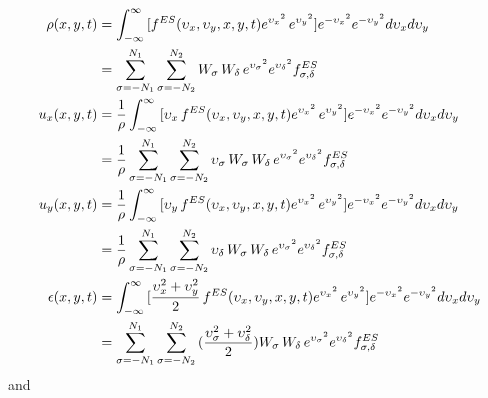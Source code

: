\documentclass{rsproca}%
\begin{document}
\begin{align}
	\begin{split}
\rho(x,y,t) &= \int^{\infty}_{-\infty}{[f^{ES}(\upsilon_x,\upsilon_y,x,y,t)e^{{\upsilon_x}^2}\,e^{{\upsilon_y}^2}]e^{-{\upsilon_x}^2}e^{-{\upsilon_y}^2}d\upsilon_x d\upsilon_y}  \\
&=\sum^{N_1}_{\sigma=-N_1}\sum^{N_2}_{\sigma=-N_2}{W_\sigma\,W_\delta\,e^{{\upsilon_\sigma}^2}e^{{\upsilon_\delta}^2}f^{ES}_{\sigma,\delta}} \\
u_x(x,y,t) &= {1 \over \rho} \int^{\infty}_{-\infty}{[\upsilon_x\,f^{ES}(\upsilon_x,\upsilon_y,x,y,t)e^{{\upsilon_x}^2}\,e^{{\upsilon_y}^2}]e^{-{\upsilon_x}^2}e^{-{\upsilon_y}^2}d\upsilon_x d\upsilon_y}  \\
&= {1 \over \rho} \sum^{N_1}_{\sigma=-N_1}\sum^{N_2}_{\sigma=-N_2}{\upsilon_\sigma\,W_\sigma\,W_\delta\,e^{{\upsilon_\sigma}^2} e^{{\upsilon_\delta}^2}f^{ES}_{\sigma,\delta}}  \\
u_y(x,y,t) &= {1 \over \rho} \int^{\infty}_{-\infty}{[\upsilon_y\,f^{ES}(\upsilon_x,\upsilon_y,x,y,t)e^{{\upsilon_x}^2}\,e^{{\upsilon_y}^2}]e^{-{\upsilon_x}^2}e^{-{\upsilon_y}^2}d\upsilon_x d\upsilon_y}  \\
&= {1 \over \rho} \sum^{N_1}_{\sigma=-N_1}\sum^{N_2}_{\sigma=-N_2}{\upsilon_\delta\,W_\sigma\,W_\delta\,e^{{\upsilon_\sigma}^2} e^{{\upsilon_\delta}^2}f^{ES}_{\sigma,\delta}} \\
\epsilon(x,y,t) &= \int^{\infty}_{-\infty}{[\frac{\upsilon^2_x+\upsilon^2_y}{2}\,f^{ES}(\upsilon_x,\upsilon_y,x,y,t)e^{{\upsilon_x}^2}\,e^{{\upsilon_y}^2}] e^{-{\upsilon_x}^2}e^{-{\upsilon_y}^2}d\upsilon_x d\upsilon_y} \\
&= \sum^{N_1}_{\sigma=-N_1}\sum^{N_2}_{\sigma=-N_2}{(\frac{\upsilon^2_\sigma+\upsilon^2_\delta}{2})W_\sigma\,W_\delta\,e^{{\upsilon_\sigma}^2} e^{{\upsilon_\delta}^2}f^{ES}_{\sigma,\delta}}
	\end{split}
\end{align}
and
\end{document}
